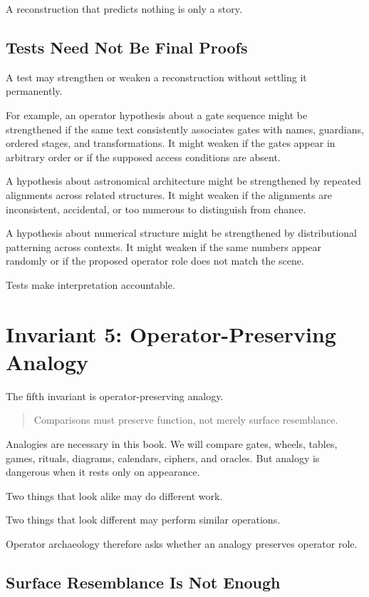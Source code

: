 \documentclass[11pt]{book}
\begin{document}
A reconstruction that predicts nothing is only a story.

\subsection{Tests Need Not Be Final Proofs}

A test may strengthen or weaken a reconstruction without settling it permanently.

For example, an operator hypothesis about a gate sequence might be strengthened if the same text consistently associates gates with names, guardians, ordered stages, and transformations. It might weaken if the gates appear in arbitrary order or if the supposed access conditions are absent.

A hypothesis about astronomical architecture might be strengthened by repeated alignments across related structures. It might weaken if the alignments are inconsistent, accidental, or too numerous to distinguish from chance.

A hypothesis about numerical structure might be strengthened by distributional patterning across contexts. It might weaken if the same numbers appear randomly or if the proposed operator role does not match the scene.

Tests make interpretation accountable.

\section{Invariant 5: Operator-Preserving Analogy}

The fifth invariant is operator-preserving analogy.

\begin{quote}
Comparisons must preserve function, not merely surface resemblance.
\end{quote}

Analogies are necessary in this book. We will compare gates, wheels, tables, games, rituals, diagrams, calendars, ciphers, and oracles. But analogy is dangerous when it rests only on appearance.

Two things that look alike may do different work.

Two things that look different may perform similar operations.

Operator archaeology therefore asks whether an analogy preserves operator role.

\subsection{Surface Resemblance Is Not Enough}
\end{document}
